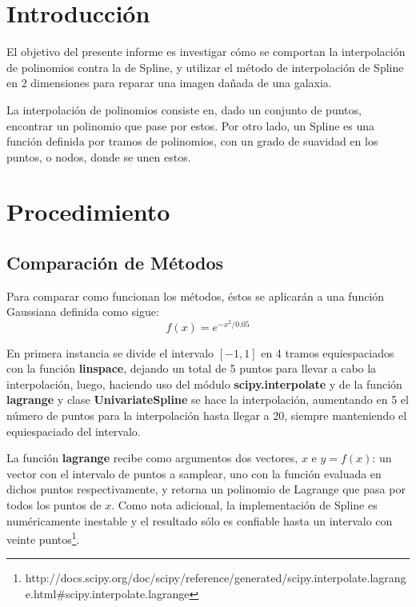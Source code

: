 \documentclass[a4paper, 11pt, spanish]{article}
\begin{document}
\clearpage


\newpage

\tableofcontents %
\listoffigures %

\newpage

\section{Introducci\'on}
El objetivo del presente informe es investigar c\'omo se comportan la interpolaci\'on de polinomios contra la de Spline, y utilizar el m\'etodo de interpolaci\'on de Spline en 2 dimensiones para reparar una imagen da\~nada de una galaxia.

La interpolaci\'on de polinomios consiste en, dado un conjunto de puntos, encontrar un polinomio que pase por estos. Por otro lado, un Spline es una funci\'on definida por tramos de polinomios, con un grado de suavidad en los puntos, o nodos, donde se unen estos.

\section{Procedimiento}
\subsection{Comparaci\'on de M\'etodos}
Para comparar como funcionan los m\'etodos, \'estos se aplicar\'an a una funci\'on Gaussiana definida como sigue:
\begin{equation}
	f(x) = e^{-x^{2}/0.05}
\end{equation}

En primera instancia se divide el intervalo $[-1,1]$ en 4 tramos equiespaciados con la funci\'on \textbf{linspace}, dejando un total de 5 puntos para llevar a cabo la interpolaci\'on, luego, haciendo uso del m\'odulo \textbf{scipy.interpolate} y de la funci\'on \textbf{lagrange} y clase \textbf{UnivariateSpline} se hace la interpolaci\'on, aumentando en 5 el n\'umero de puntos para la interpolaci\'on hasta llegar a 20, siempre manteniendo el equiespaciado del intervalo.

La funci\'on \textbf{lagrange} recibe como argumentos dos vectores, $x$ e $y = f(x)$: un vector con el intervalo de puntos a samplear, uno con la funci\'on evaluada en dichos puntos respectivamente, y retorna un polinomio de Lagrange que pasa por todos los puntos de $x$. Como nota adicional, la implementaci\'on de Spline es num\'ericamente inestable y el resultado s\'olo es confiable hasta un intervalo con veinte puntos\footnote{http://docs.scipy.org/doc/scipy/reference/generated/scipy.interpolate.lagrange.html\#scipy.interpolate.lagrange}.
\end{document}

